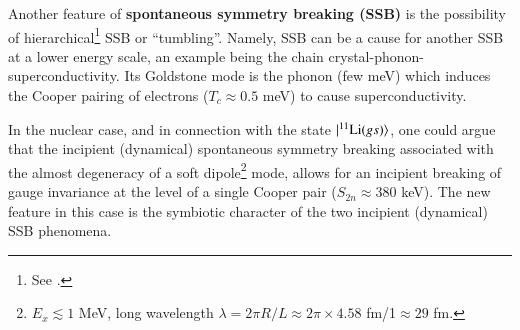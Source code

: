 \begin{subappendices}
  
  Another feature of \textbf{spontaneous symmetry breaking (SSB)} is the possibility of hierarchical\footnote{See \cite{Nambu:91}.} SSB or ``tumbling''. Namely, SSB can be a cause for another SSB at a lower energy scale, an example being the chain crystal-phonon-superconductivity. Its Goldstone mode is the phonon (few meV) which induces the Cooper pairing of electrons ($T_c\approx0.5$ meV) to cause superconductivity.
  
  In the nuclear case, and in connection with the state $|{^{11}\text{Li}(gs)} \rangle $, one could argue that the incipient (dynamical) spontaneous symmetry breaking associated with the almost degeneracy of a soft dipole\footnote{$E_x\lesssim1$ MeV, long wavelength $\lambda=2\pi R/L\approx 2\pi\times 4.58$ fm/1$\approx 29$ fm.} mode, allows for an incipient breaking of gauge invariance at the level of a single Cooper pair ($S_{2n}\approx380$ keV). The new feature in this case is the symbiotic character of the two incipient (dynamical) SSB phenomena.

\end{subappendices}

